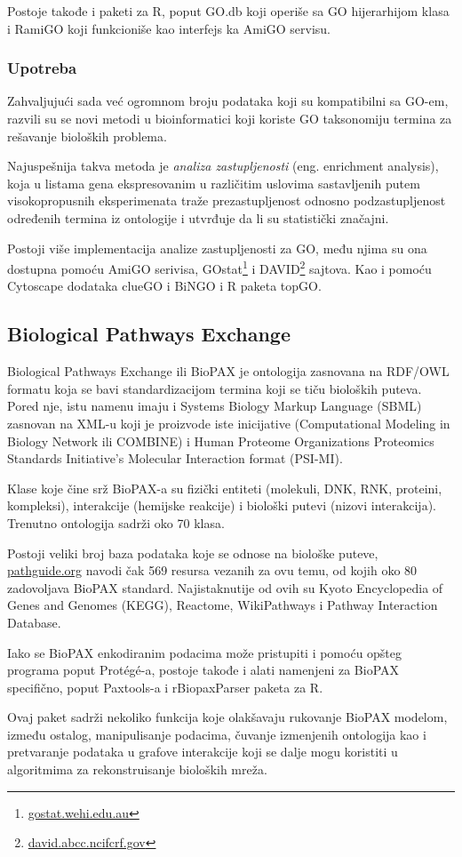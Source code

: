 Postoje takođe i paketi za R, poput GO.db koji operiše sa GO hijerarhijom klasa i RamiGO koji funkcioniše kao interfejs ka AmiGO servisu.

\subsubsection{Upotreba}

Zahvaljujući sada već ogromnom broju podataka koji su kompatibilni sa GO-em, razvili su se novi metodi u bioinformatici koji koriste GO taksonomiju termina za rešavanje bioloških problema. 

Najuspešnija takva metoda je \emph{analiza zastupljenosti} (eng. enrichment analysis), koja u listama gena ekspresovanim u različitim uslovima sastavljenih putem visokopropusnih eksperimenata traže prezastupljenost odnosno podzastupljenost određenih termina iz ontologije i utvrđuje da li su statistički značajni.

Postoji više implementacija analize zastupljenosti za GO, među njima su ona dostupna pomoću AmiGO serivisa, GOstat\footnote{\url{gostat.wehi.edu.au}} i DAVID\footnote{\url{david.abcc.ncifcrf.gov}} sajtova. Kao i pomoću Cytoscape dodataka clueGO i BiNGO i R paketa topGO.




\subsection{Biological Pathways Exchange}

Biological Pathways Exchange ili BioPAX je ontologija zasnovana na RDF/OWL formatu koja se bavi standardizacijom termina koji se tiču bioloških puteva. 
Pored nje, istu namenu imaju i Systems Biology Markup Language (SBML) zasnovan na XML-u koji je proizvode iste inicijative (Computational Modeling in Biology Network ili COMBINE) i Human Proteome Organizations Proteomics Standards Initiative’s Molecular Interaction format (PSI-MI).

Klase koje čine srž BioPAX-a su fizički entiteti (molekuli, DNK, RNK, proteini, kompleksi), interakcije (hemijske reakcije) i biološki putevi (nizovi interakcija). Trenutno ontologija sadrži oko 70 klasa.

Postoji veliki broj baza podataka koje se odnose na biološke puteve, \url{pathguide.org} navodi čak 569 resursa vezanih za ovu temu, od kojih oko 80 zadovoljava BioPAX standard.
Najistaknutije od ovih su Kyoto Encyclopedia of Genes and Genomes (KEGG), Reactome, WikiPathways i Pathway Interaction Database.

Iako se BioPAX enkodiranim podacima može pristupiti i pomoću op\-šteg programa poput Protégé-a, postoje takođe i alati namenjeni za BioPAX specifično, poput Paxtools-a i rBiopaxParser paketa za R.

Ovaj paket sadrži nekoliko funkcija koje olakšavaju rukovanje BioPAX modelom, između ostalog, manipulisanje podacima, čuvanje izmenjenih ontologija kao i pretvaranje podataka u grafove interakcije koji se dalje mogu koristiti u algoritmima za rekonstruisanje bioloških mreža.






